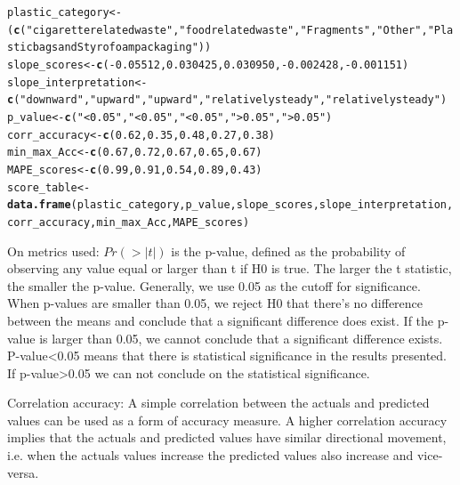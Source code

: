 \documentclass[10pt]{article}\usepackage[]{graphicx}\usepackage[]{color}
\makeatletter
\newcommand{\hlnum}[1]{\textcolor[rgb]{0.686,0.059,0.569}{#1}}%
\newcommand{\hlstr}[1]{\textcolor[rgb]{0.192,0.494,0.8}{#1}}%
\newcommand{\hlopt}[1]{\textcolor[rgb]{0,0,0}{#1}}%
\newcommand{\hlstd}[1]{\textcolor[rgb]{0.345,0.345,0.345}{#1}}%
\newcommand{\hlkwb}[1]{\textcolor[rgb]{0.69,0.353,0.396}{#1}}%
\newcommand{\hlkwd}[1]{\textcolor[rgb]{0.737,0.353,0.396}{\textbf{#1}}}%
\newenvironment{kframe}{%
 \def\at@end@of@kframe{}%
 \ifinner\ifhmode%
  \def\at@end@of@kframe{\end{minipage}}%
  \begin{minipage}{\columnwidth}%
 \fi\fi%
 \def\FrameCommand##1{\hskip\@totalleftmargin \hskip-\fboxsep
 \colorbox{shadecolor}{##1}\hskip-\fboxsep
     \hskip-\linewidth \hskip-\@totalleftmargin \hskip\columnwidth}%
 \MakeFramed {\advance\hsize-\width
   \@totalleftmargin\z@ \linewidth\hsize
   \@setminipage}}%
 {\par\unskip\endMakeFramed%
 \at@end@of@kframe}
\newenvironment{knitrout}{}{} %
\makeatother
\begin{document}
\begin{knitrout}\small
{}\color{fgcolor}\begin{kframe}
\begin{alltt}
\hlstd{plastic_category} \hlkwb{<-}\hlstd{(}\hlkwd{c}\hlstd{(}\hlstr{"cigarette related waste"}\hlstd{,} \hlstr{"food related waste"}\hlstd{,}\hlstr{"Fragments"}\hlstd{,} \hlstr{"Other"}\hlstd{,}\hlstr{"Plastic bags and Styrofoam packaging"} \hlstd{))}
\hlstd{slope_scores} \hlkwb{<-} \hlkwd{c}\hlstd{(}\hlopt{-}\hlnum{0.05512}\hlstd{,}\hlnum{0.030425}\hlstd{,} \hlnum{0.030950}\hlstd{,}\hlopt{-}\hlnum{0.002428}\hlstd{,}\hlopt{-}\hlnum{0.001151}\hlstd{)}
\hlstd{slope_interpretation} \hlkwb{<-}\hlkwd{c}\hlstd{(}\hlstr{"downward"}\hlstd{,} \hlstr{"upward"}\hlstd{,} \hlstr{"upward"}\hlstd{,} \hlstr{"relatively steady"}\hlstd{,} \hlstr{"relatively steady"}\hlstd{)}
\hlstd{p_value}\hlkwb{<-}\hlkwd{c}\hlstd{(}\hlstr{"<0.05"}\hlstd{,}\hlstr{"<0.05"}\hlstd{,}\hlstr{"<0.05"}\hlstd{,} \hlstr{">0.05"}\hlstd{,}\hlstr{">0.05"}\hlstd{)}
\hlstd{corr_accuracy}\hlkwb{<-}\hlkwd{c}\hlstd{(}\hlnum{0.62}\hlstd{,} \hlnum{0.35}\hlstd{,}\hlnum{0.48}\hlstd{,} \hlnum{0.27}\hlstd{,}\hlnum{0.38}\hlstd{)}
\hlstd{min_max_Acc}\hlkwb{<-}\hlkwd{c}\hlstd{(}\hlnum{0.67}\hlstd{,}\hlnum{0.72}\hlstd{,}\hlnum{0.67}\hlstd{,} \hlnum{0.65} \hlstd{,}\hlnum{0.67}\hlstd{)}
\hlstd{MAPE_scores}\hlkwb{<-}\hlkwd{c}\hlstd{(}\hlnum{0.99}\hlstd{,}\hlnum{0.91}\hlstd{,}\hlnum{0.54}\hlstd{,} \hlnum{0.89}\hlstd{,} \hlnum{0.43}\hlstd{)}
\hlstd{score_table} \hlkwb{<-} \hlkwd{data.frame}\hlstd{(plastic_category, p_value,slope_scores, slope_interpretation, corr_accuracy,min_max_Acc, MAPE_scores)}
\end{alltt}
\end{kframe}
\end{knitrout}

On metrics used:
$Pr(>|t|)$ is the p-value, defined as the probability of observing any value equal or larger than t if H0 is true. The larger the t statistic, the smaller the p-value. Generally, we use 0.05 as the cutoff for significance. When p-values are smaller than 0.05, we reject H0 that there's no difference between the means and conclude that a significant difference does exist. If the p-value is larger than 0.05, we cannot conclude that a significant difference exists. P-value<0.05 means that there is statistical significance in the results presented. If p-value>0.05 we can not conclude on the statistical significance. 

Correlation accuracy:
A simple correlation between the actuals and predicted values can be used as a form of accuracy measure.
A higher correlation accuracy implies that the actuals and predicted values have similar directional movement, i.e. when the actuals values increase the predicted values also increase and vice-versa.
\end{document}
